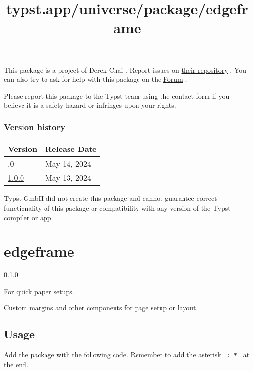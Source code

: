 This package is a project of Derek Chai . Report issues on
\href{https://github.com/derekchai/typst-karnaugh-map}{their repository}
. You can also try to ask for help with this package on the
\href{https://forum.typst.app}{Forum} .

Please report this package to the Typst team using the
\href{https://typst.app/contact}{contact form} if you believe it is a
safety hazard or infringes upon your rights.

\label{versions}
\subsubsection{Version history}\label{version-history}

\begin{longtable}[]{@{}ll@{}}
\toprule\noalign{}
Version & Release Date \\
\midrule\noalign{}
\endhead
\bottomrule\noalign{}
\endlastfoot
1.1.0 & May 14, 2024 \\
\href{https://typst.app/universe/package/k-mapper/1.0.0/}{1.0.0} & May
13, 2024 \\
\end{longtable}

Typst GmbH did not create this package and cannot guarantee correct
functionality of this package or compatibility with any version of the
Typst compiler or app.


\title{typst.app/universe/package/edgeframe}

\label{banner}
\section{edgeframe}\label{edgeframe}

{ 0.1.0 }

For quick paper setups.

\label{readme}
Custom margins and other components for page setup or layout.

\subsection{Usage}\label{usage}

Add the package with the following code. Remember to add the asterisk
\texttt{\ :\ *\ } at the end.

\begin{Shaded}
\begin{Highlighting}[]
\end{Highlighting}
\end{Shaded}

